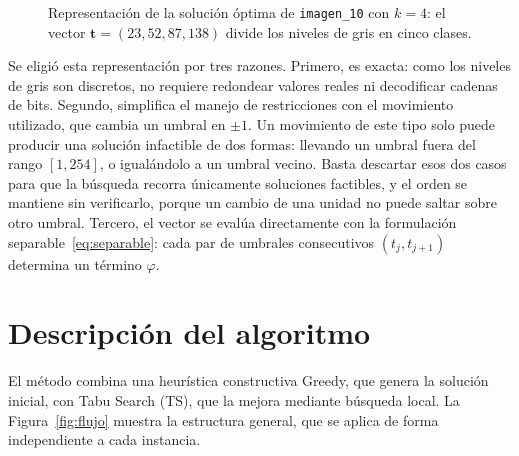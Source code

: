 \documentclass[letter, 10pt]{article}
\begin{document}
\begin{figure}[h]
    \centering
    \caption{Representación de la solución óptima de \texttt{imagen\_10} con $k = 4$: el vector $\mathbf{t} = (23, 52, 87, 138)$ divide los niveles de gris en cinco clases.}
    \label{fig:representacion}
\end{figure}

Se eligió esta representación por tres razones. Primero, es exacta: como los niveles de gris son discretos, no requiere redondear valores reales ni decodificar cadenas de bits. Segundo, simplifica el manejo de restricciones con el movimiento utilizado, que cambia un umbral en $\pm 1$. Un movimiento de este tipo solo puede producir una solución infactible de dos formas: llevando un umbral fuera del rango $[1, 254]$, o igualándolo a un umbral vecino. Basta descartar esos dos casos para que la búsqueda recorra únicamente soluciones factibles, y el orden se mantiene sin verificarlo, porque un cambio de una unidad no puede saltar sobre otro umbral. Tercero, el vector se evalúa directamente con la formulación separable~\eqref{eq:separable}: cada par de umbrales consecutivos $(t_j, t_{j+1})$ determina un término $\varphi$.

\section{Descripción del algoritmo}
\label{sec:algoritmo}
El método combina una heurística constructiva Greedy, que genera la solución inicial, con Tabu Search (TS), que la mejora mediante búsqueda local. La Figura~\ref{fig:flujo} muestra la estructura general, que se aplica de forma independiente a cada instancia.
\end{document}
